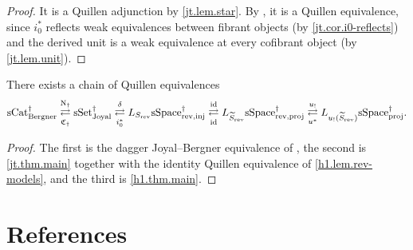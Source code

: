 \documentclass[a4paper,dvipdfmx,11pt]{amsart}
\begin{document}
\begin{proof}
  It is a Quillen adjunction by \cref{jt.lem.star}.
  By \cite[Corollary 1.3.16]{Hov99}, it is a Quillen equivalence, since $i_{0}^{*}$ reflects weak equivalences between fibrant objects (by \cref{jt.cor.i0-reflects}) and the derived unit is a weak equivalence at every cofibrant object (by \cref{jt.lem.unit}).
\end{proof}

\begin{corollary}\label{jt.cor.goal}
  There exists a chain of Quillen equivalences
  \begin{align}
    \mathrm{sCat}^{\dag}_{\mathrm{Bergner}}
    \underset{\mathfrak{C}_{\dag}}{\overset{\mathrm{N}_{\dag}}{\rightleftarrows}}
    \mathrm{sSet}^{\dag}_{\mathrm{Joyal}}
    \underset{i_0^*}{\overset{\delta}{\rightleftarrows}}
    L_{S_{\mathrm{rev}}}\mathrm{sSpace}^{\dag}_{\mathrm{rev},\mathrm{inj}} 
    \underset{\operatorname{id}}{\overset{\operatorname{id}}{\rightleftarrows}}
    L_{\widetilde S_{\mathrm{rev}}}\mathrm{sSpace}^{\dag}_{\mathrm{rev},\mathrm{proj}}
    \underset{u^*}{\overset{u_!}{\rightleftarrows}}
    L_{u_!(\widetilde S_{\mathrm{rev}})}\mathrm{sSpace}^{\dag}_{\mathrm{proj}}.
  \end{align}
\end{corollary}

\begin{proof}
  The first is the dagger Joyal--Bergner equivalence of \cite[Theorem~3.5.6]{Aka26}, the second is \cref{jt.thm.main} together with the identity Quillen equivalence of \cref{h1.lem.rev-models}, and the third is \cref{h1.thm.main}.
\end{proof}

\section*{References}
\begingroup
\printbibliography[heading=none]
\endgroup
\end{document}
